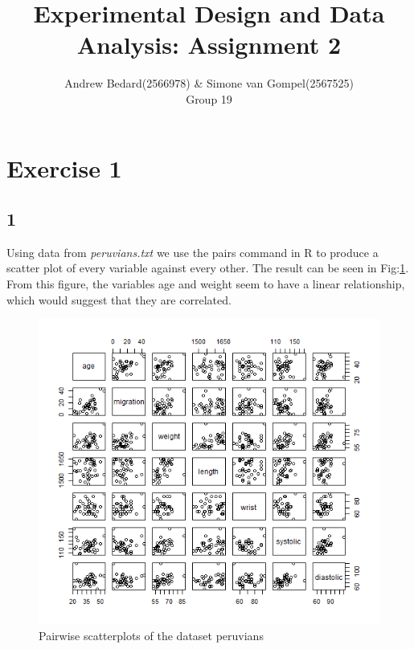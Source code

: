 \documentclass{article}
\title{Experimental Design and Data Analysis: Assignment 2}
\author{Andrew Bedard(2566978) \& Simone van Gompel(2567525) \\ Group 19}
\begin{document}
  \maketitle

  \section{Exercise 1}
  \subsection*{1}
  Using data from \textit{peruvians.txt} we use the pairs command in R to produce a scatter plot of every variable against every other. The result can be seen in Fig:\ref{fig:Pairs}. From this figure, the variables age and weight seem to have a linear relationship, which would suggest that they are correlated.

    \begin{figure}[!htb]
      \includegraphics[scale=0.6]{../results/Pairs.png}
      \caption{Pairwise scatterplots of the dataset peruvians}
      \label{fig:Pairs}
    \end{figure}
    
\end{document}
